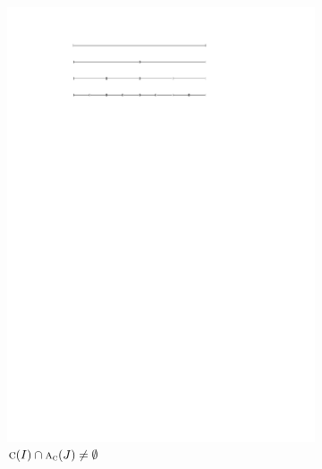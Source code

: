 \documentclass[english,gradu]{tktltiki2018}
\begin{document}
\begin{figure}
\begin{subfigure}[t]{0.32\textwidth}
		\includegraphics[width=\textwidth,page=4]{fig/iproof}
		\caption{$\textsc{c}(I)\cap\textsc{a}_{\textsc{c}}(J)\neq\emptyset$}\label{fig:iproof:anc}
	\end{subfigure}
	\hfil
	\begin{subfigure}[t]{0.32\textwidth}\centering

\end{subfigure}
\end{figure}
\end{document}
